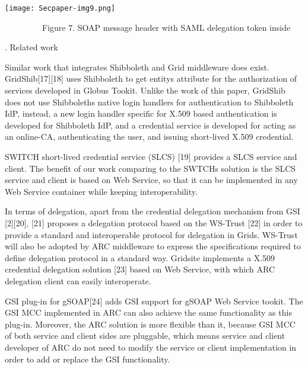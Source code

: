 \documentclass{article}
\begin{document}
\bigskip


\bigskip



\begin{center}
\texttt{[image: Secpaper-img9.png]}
\end{center}

\bigskip

{\centering
\ \ \ \ \ \ \ \ \ Figure 7. SOAP message header with SAML delegation
token inside
\par}


\bigskip

{. Related work
\par}

Similar work that integrates Shibboleth and Grid middleware does exist.
GridShib[17][18] uses Shibboleth to get entity{\textquotesingle}s
attribute for the authorization of services developed in Globus Tookit.
Unlike the work of this paper, GridShib does not use
Shibboleth{\textquotesingle}s native login handlers for authentication
to Shibboleth IdP, instead, a new login handler specific for X.509
based authentication is developed for Shibboleth IdP, and a credential
service is developed for acting as an online-CA, authenticating the
user, and issuing short-lived X.509 credential.

SWITCH short-lived credential service (SLCS) [19] provides a SLCS
service and client. The benefit of our work comparing to the
SWTCH{\textquotesingle}s solution is the SLCS service and client is
based on Web Service, so that it can be implemented in any Web Service
container while keeping interoperability.

In terms of delegation, apart from the credential delegation mechanism
from GSI [2][20], [21] proposes a delegation protocol based on the
WS-Trust [22] in order to provide a standard and interoperable protocol
for delegation in Grids. WS-Trust will also be adopted by ARC
middleware to express the specifications required to define delegation
protocol in a standard way. Gridsite implements a X.509 credential
delegation solution [23] based on Web Service, with which ARC
delegation client can easily interoperate. 

GSI plug-in for gSOAP[24] adds GSI support for gSOAP Web Service tookit.
The GSI MCC implemented in ARC can also achieve the same functionality
as this plug-in. Moreover, the ARC solution is more flexible than it,
because GSI MCC of both service and client sides are pluggable, which
means service and client developer of ARC do not need to modify the
service or client implementation in order to add or replace the GSI
functionality.
\end{document}
